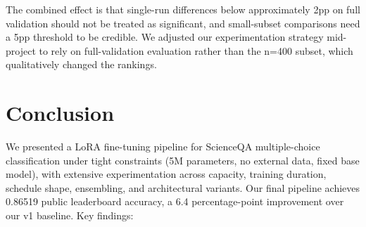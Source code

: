 \documentclass[11pt]{article}
\begin{document}
The combined effect is that single-run differences below approximately 2pp on full validation should not be treated as significant, and small-subset comparisons need a 5pp threshold to be credible. We adjusted our experimentation strategy mid-project to rely on full-validation evaluation rather than the n=400 subset, which qualitatively changed the rankings.

\section{Conclusion}

We presented a LoRA fine-tuning pipeline for ScienceQA multiple-choice classification under tight constraints (5M parameters, no external data, fixed base model), with extensive experimentation across capacity, training duration, schedule shape, ensembling, and architectural variants. Our final pipeline achieves 0.86519 public leaderboard accuracy, a 6.4 percentage-point improvement over our v1 baseline. Key findings:
\end{document}
